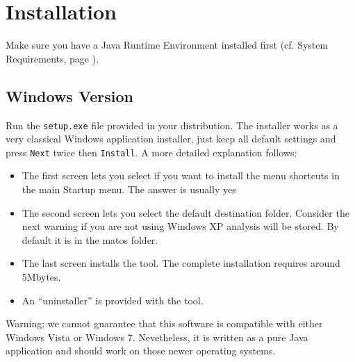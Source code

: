 \chapter{Installation}


Make sure you have a Java Runtime Environment installed first
(cf. System Requirements, page \pageref{SysReqs}).

\section{Windows Version}
Run the \texttt{setup.exe} file provided in your \ma distribution. The
installer works as a very classical Windows application installer,
just keep all default settings and press \texttt{Next} twice then
\texttt{Install}. A more detailed explanation follows:
\begin{itemize}
\item The first screen lets you select if you want to install the menu shortcuts in the main Startup menu. The answer is usually yes
\item The second screen lets you select the default destination folder. Consider the next warning if you are not using Windows XP
analysis will be stored. By default it is in the matos folder.
\item The last screen installs the tool. The complete installation requires around 5Mbytes.
\item An ``uninstaller'' is provided with the tool.
\end{itemize}

Warning: we cannot guarantee that this software is compatible with either
Windows Vista or Windows 7. Nevetheless, it is written as a pure Java
application and should work on those newer operating systems.



